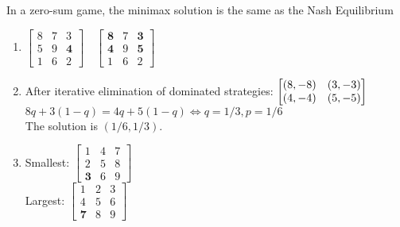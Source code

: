 \documentclass[../main.tex]{subfiles}
\begin{document}
\begin{solution}
In a zero-sum game, the minimax solution is the same as the Nash Equilibrium
\begin{enumerate}
	\item
	$	\begin{bmatrix}
	  		8 & 7 & 3 \\
	  		5 & 9 & \textbf{4} \\
	  		1 & 6 & 2
	 	\end{bmatrix}
		\quad
		\begin{bmatrix}
			\textbf{8} & 7 & \textbf{3} \\
			\textbf{4} & 9 & \textbf{5} \\
			1 & 6 & 2
		 \end{bmatrix}
	$
	\item After iterative elimination of dominated strategies:
	$
		\begin{bmatrix}
		(8,-8) & (3,-3) \\
		(4,-4) & (5,-5)
		\end{bmatrix} \\
	$
	$ 8q + 3(1-q) = 4q + 5(1-q)
		 \Leftrightarrow q = 1/3, p = 1/6$\\
	The solution is $(1/6,1/3)$.

	\item
	Smallest:
	$	\begin{bmatrix}
		 	1 & 4 & 7 \\
		 	2 & 5 & 8 \\
		 	\textbf{3} & 6 & 9
		 \end{bmatrix}$\\
	Largest:
	$	\begin{bmatrix}
		 	1 & 2 & 3 \\
		 	4 & 5 & 6 \\
		 	\textbf{7} & 8 & 9
		\end{bmatrix}$\\
\end{enumerate}
\end{solution}
\end{document}
